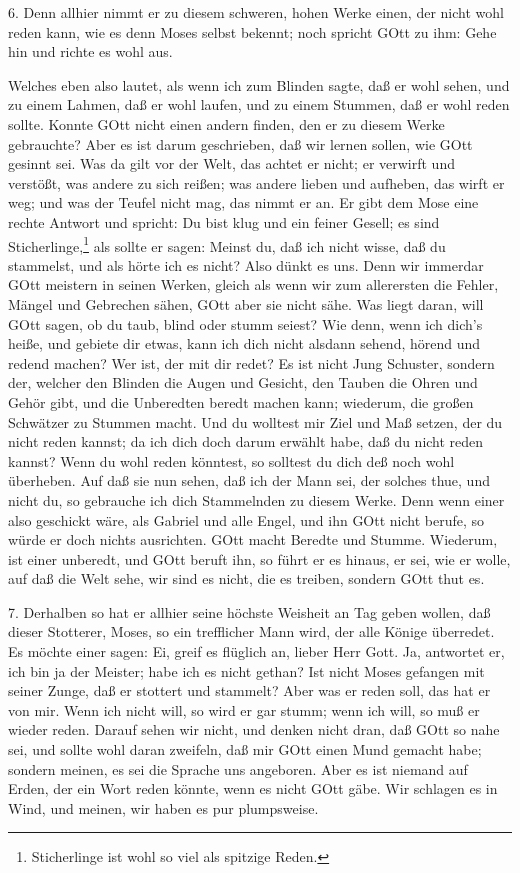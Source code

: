 6. Denn allhier nimmt er zu diesem schweren, hohen Werke einen, der nicht wohl reden kann, wie es denn Moses selbst bekennt; noch spricht GOtt zu ihm: Gehe hin und richte es wohl aus.

Welches eben also lautet, als wenn ich zum Blinden sagte, daß er wohl sehen, und zu einem Lahmen, daß er wohl laufen, und zu einem Stummen, daß er wohl reden sollte. Konnte GOtt nicht einen andern finden, den er zu diesem Werke gebrauchte? Aber es ist darum geschrieben, daß wir lernen sollen, wie GOtt gesinnt sei. Was da gilt vor der Welt, das achtet er nicht; er verwirft und verstößt, was andere zu sich reißen; was andere lieben und aufheben, das wirft er weg; und was der Teufel nicht mag, das nimmt er an. Er gibt dem Mose eine rechte Antwort und spricht: Du bist klug und ein feiner Gesell; es sind Sticherlinge,\footnote{Sticherlinge ist wohl so viel als spitzige Reden.} als sollte er sagen: Meinst du, daß ich nicht wisse, daß du stammelst, und als hörte ich es nicht? Also dünkt es uns. Denn wir immerdar GOtt meistern in seinen Werken, gleich als wenn wir zum allerersten die Fehler, Mängel und Gebrechen sähen, GOtt aber sie nicht sähe. Was liegt daran, will GOtt sagen, ob du taub, blind oder stumm seiest? Wie denn, wenn ich dich's heiße, und gebiete dir etwas, kann ich dich nicht alsdann sehend, hörend und redend machen? Wer ist, der mit dir redet? Es ist nicht Jung Schuster, sondern der, welcher den Blinden die Augen und Gesicht, den Tauben die Ohren und Gehör gibt, und die Unberedten beredt machen kann; wiederum, die großen Schwätzer zu Stummen macht. Und du wolltest mir Ziel und Maß setzen, der du nicht reden kannst; da ich dich doch darum erwählt habe, daß du nicht reden kannst? Wenn du wohl reden könntest, so solltest du dich deß noch wohl überheben. Auf daß sie nun sehen, daß ich der Mann sei, der solches thue, und nicht du, so gebrauche ich dich Stammelnden zu diesem Werke. Denn wenn einer also geschickt wäre, als Gabriel und alle Engel, und ihn GOtt nicht berufe, so würde er doch nichts ausrichten. GOtt macht Beredte und Stumme. Wiederum, ist einer unberedt, und GOtt beruft ihn, so führt er es hinaus, er sei, wie er wolle, auf daß die Welt sehe, wir sind es nicht, die es treiben, sondern GOtt thut es.

7. Derhalben so hat er allhier seine höchste Weisheit an Tag geben wollen, daß dieser Stotterer, Moses, so ein trefflicher Mann wird, der alle Könige überredet. Es möchte einer sagen: Ei, greif es flüglich an, lieber Herr Gott. Ja, antwortet er, ich bin ja der Meister; habe ich es nicht gethan? Ist nicht Moses gefangen mit seiner Zunge, daß er stottert und stammelt? Aber was er reden soll, das hat er von mir. Wenn ich nicht will, so wird er gar stumm; wenn ich will, so muß er wieder reden. Darauf sehen wir nicht, und denken nicht dran, daß GOtt so nahe sei, und sollte wohl daran zweifeln, daß mir GOtt einen Mund gemacht habe; sondern meinen, es sei die Sprache uns angeboren. Aber es ist niemand auf Erden, der ein Wort reden könnte, wenn es nicht GOtt gäbe. Wir schlagen es in Wind, und meinen, wir haben es pur plumpsweise.


